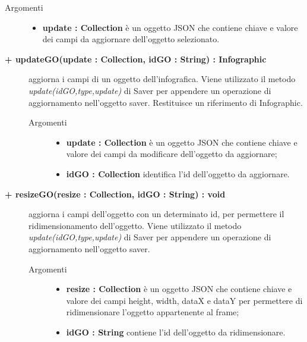 \begin{description}
\begin{description}
\begin{description}
			\item[Argomenti] \hfill
				\begin{itemize}
						\item \textbf{update : Collection			} \hfill
					è un oggetto JSON che contiene chiave e valore dei campi da aggiornare dell'oggetto selezionato.
				\end{itemize}

\end{description}

\end{description}

\begin{description}
		\item[\textbf{\color{blue}+ updateGO(update : Collection, idGO : String) : Infographic			}] \hfill
			aggiorna i campi di un oggetto dell'infografica. Viene utilizzato il metodo \textit{update(idGO,type,update)} di Saver per appendere un operazione di aggiornamento nell'oggetto saver. Restituisce un riferimento di Infographic.   

\begin{description}
			\item[Argomenti] \hfill
				\begin{itemize}
						\item \textbf{update : Collection			} \hfill
					è un oggetto JSON che contiene chiave e valore dei campi da modificare dell'oggetto da aggiornare;
					\item \textbf{idGO : Collection			} \hfill
					identifica l'id dell'oggetto da aggiornare.
				\end{itemize}

\end{description}

\end{description}

\begin{description}
		\item[\textbf{\color{blue}+ resizeGO(resize : Collection, idGO : String) : void			}] \hfill
			aggiorna i campi dell'oggetto con un determinato id, per permettere il ridimensionamento dell'oggetto. Viene utilizzato il metodo \textit{update(idGO,type,update)} di Saver per appendere un operazione di aggiornamento nell'oggetto saver.     

\begin{description}
			\item[Argomenti] \hfill
				\begin{itemize}
					\item \textbf{resize : Collection			} \hfill
					è un oggetto JSON che contiene chiave e valore dei campi height, width, dataX e dataY per permettere di ridimensionare l'oggetto appartenente al frame;
					\item \textbf{idGO : String			} \hfill
					contiene l'id dell'oggetto da ridimensionare.
				\end{itemize}


\end{description}
\end{description}
\end{description}
